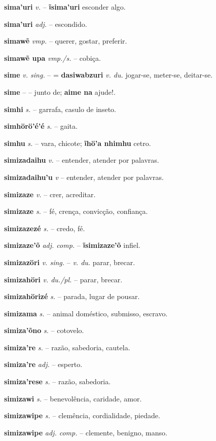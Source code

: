 \textbf{sima'uri} \textit{v.} -- \textbf{ĩsima'uri} esconder algo.

\textbf{sima'uri} \textit{adj.} -- escondido.

\textbf{simawẽ} \textit{vmp.} -- querer, gostar, preferir.

\textbf{simawẽ upa} \textit{vmp./s.} -- cobiça.

\textbf{sime} \textit{v. sing.} -- = \textbf{dasiwabzuri} \textit{v. du.} jogar-se, meter-se, deitar-se.

\textbf{sime} \textit{} -- -- junto de; \textbf{aime na} ajude!.

\textbf{simhi} \textit{s.} -- garrafa, casulo de inseto.

\textbf{simhörö'é'é} \textit{s.} -- gaita.

\textbf{simhu} \textit{s.} -- vara, chicote; \textbf{ĩhö'a nhimhu} cetro.

\textbf{simizadaihu} \textit{v.} -- entender, atender por palavras.

\textbf{simizadaihu'u} \textit{v} -- entender, atender por palavras.

\textbf{simizaze} \textit{v.} -- crer, acreditar.

\textbf{simizaze} \textit{s.} -- fé, crença, convicção, confiança.

\textbf{simizazezé} \textit{s.} -- credo, fé.

\textbf{simizaze'õ} \textit{adj. comp.} -- \textbf{ĩsimizaze'õ} infiel.

\textbf{simizazöri} \textit{v. sing.} -- \textit{v. du.} parar, brecar.

\textbf{simizahöri} \textit{v. du./pl.} -- parar, brecar.

\textbf{simizahörizé} \textit{s.} -- parada, lugar de pousar.

\textbf{simizama} \textit{s.} -- animal doméstico, submisso, escravo.

\textbf{simiza'õno} \textit{s.} -- cotovelo.

\textbf{simiza're} \textit{s.} -- razão, sabedoria, cautela.

\textbf{simiza're} \textit{adj.} -- esperto.

\textbf{simiza'rese} \textit{s.} -- razão, sabedoria.

\textbf{simizawi} \textit{s.} -- benevolência, caridade, amor.

\textbf{simizawipe} \textit{s.} -- clemência, cordialidade, piedade.

\textbf{simizawipe} \textit{adj. comp.} -- clemente, benigno, manso.

